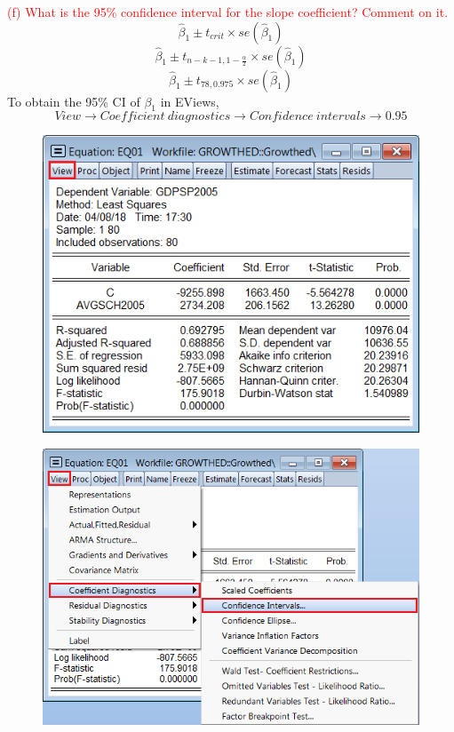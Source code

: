 \documentclass[12pt]{report}
\begin{document}
\noindent \textcolor{red}{(f) What is the 95\% confidence interval for the slope coefficient? Comment on it.} 
$$\hat{\beta}_1 \pm t_{crit} \times se(\hat{\beta}_1)$$
$$\hat{\beta}_1 \pm t_{n-k-1,1-\frac{\alpha}{2}} \times se(\hat{\beta}_1)$$
$$\hat{\beta}_1 \pm t_{78,0.975} \times se(\hat{\beta}_1)$$
\noindent To obtain the 95\% CI of $\beta_1$ in EViews,
$$View \to Coefficient\ diagnostics \to Confidence\ intervals \to 0.95$$
\begin{figure}[H]
	\centering
	\includegraphics{tute6_q4_8}
\end{figure}
\vspace{-\baselineskip}
\begin{figure}[H]
	\centering
	\includegraphics{tute6_q4_9}
\end{figure}
\end{document}

